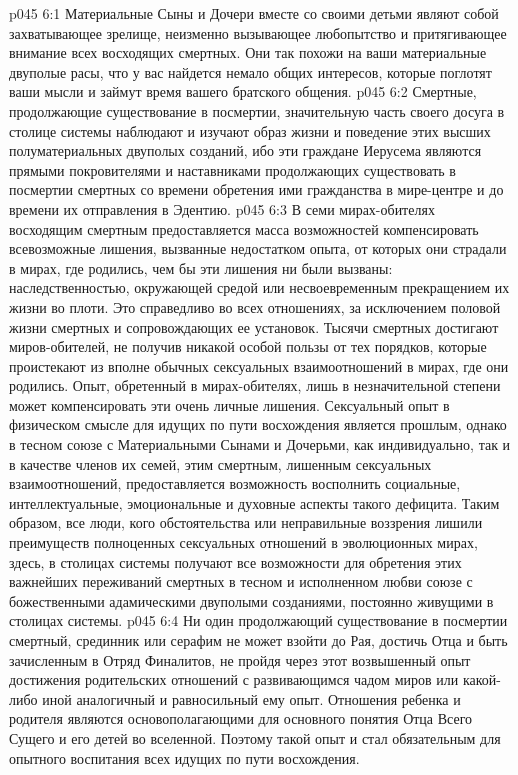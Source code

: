 \vs p045 6:1 Материальные Сыны и Дочери вместе со своими детьми являют собой захватывающее зрелище, неизменно вызывающее любопытство и притягивающее внимание всех восходящих смертных. Они так похожи на ваши материальные двуполые расы, что у вас найдется немало общих интересов, которые поглотят ваши мысли и займут время вашего братского общения.
\vs p045 6:2 Смертные, продолжающие существование в посмертии, значительную часть своего досуга в столице системы наблюдают и изучают образ жизни и поведение этих высших полуматериальных двуполых созданий, ибо эти граждане Иерусема являются прямыми покровителями и наставниками продолжающих существовать в посмертии смертных со времени обретения ими гражданства в мире\hyp{}центре и до времени их отправления в Эдентию.
\vs p045 6:3 В семи мирах\hyp{}обителях восходящим смертным предоставляется масса возможностей компенсировать всевозможные лишения, вызванные недостатком опыта, от которых они страдали в мирах, где родились, чем бы эти лишения ни были вызваны: наследственностью, окружающей средой или несвоевременным прекращением их жизни во плоти. Это справедливо во всех отношениях, за исключением половой жизни смертных и сопровождающих ее установок. Тысячи смертных достигают миров\hyp{}обителей, не получив никакой особой пользы от тех порядков, которые проистекают из вполне обычных сексуальных взаимоотношений в мирах, где они родились. Опыт, обретенный в мирах\hyp{}обителях, лишь в незначительной степени может компенсировать эти очень личные лишения. Сексуальный опыт в физическом смысле для идущих по пути восхождения является прошлым, однако в тесном союзе с Материальными Сынами и Дочерьми, как индивидуально, так и в качестве членов их семей, этим смертным, лишенным сексуальных взаимоотношений, предоставляется возможность восполнить социальные, интеллектуальные, эмоциональные и духовные аспекты такого дефицита. Таким образом, все люди, кого обстоятельства или неправильные воззрения лишили преимуществ полноценных сексуальных отношений в эволюционных мирах, здесь, в столицах системы получают все возможности для обретения этих важнейших переживаний смертных в тесном и исполненном любви союзе с божественными адамическими двуполыми созданиями, постоянно живущими в столицах системы.
\vs p045 6:4 \pc Ни один продолжающий существование в посмертии смертный, срединник или серафим не может взойти до Рая, достичь Отца и быть зачисленным в Отряд Финалитов, не пройдя через этот возвышенный опыт достижения родительских отношений с развивающимся чадом миров или какой\hyp{}либо иной аналогичный и равносильный ему опыт. Отношения ребенка и родителя являются основополагающими для основного понятия Отца Всего Сущего и его детей во вселенной. Поэтому такой опыт и стал обязательным для опытного воспитания всех идущих по пути восхождения.
